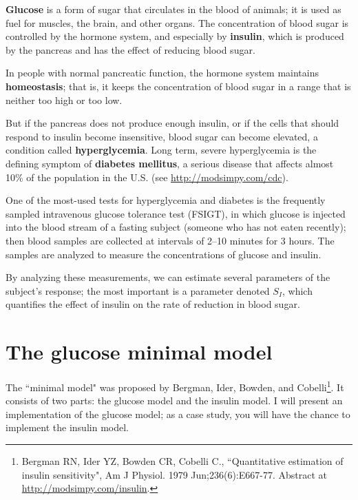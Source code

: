 \documentclass[12pt]{book}
\theoremstyle{exercise}
\begin{document}
{\bf Glucose} is a form of sugar that circulates in the blood of animals; it is used as fuel for muscles, the brain, and other organs.  The concentration of blood sugar is controlled by the hormone system, and especially by {\bf insulin}, which is produced by the pancreas and has the effect of reducing blood sugar.


In people with normal pancreatic function, the hormone system maintains {\bf homeostasis}; that is, it keeps the concentration of blood sugar in a range that is neither too high or too low.

But if the pancreas does not produce enough insulin, or if the cells that should respond to insulin become insensitive, blood sugar can become elevated, a condition called {\bf hyperglycemia}.  Long term, severe hyperglycemia is the defining symptom of {\bf diabetes mellitus}, a serious disease that affects almost 10\% of the population in the U.S. (see \url{http://modsimpy.com/cdc}).


One of the most-used tests for hyperglycemia and diabetes is the frequently sampled intravenous glucose tolerance test (FSIGT), in which glucose is injected into the blood stream of a fasting subject (someone who has not eaten recently); then blood samples are collected at intervals of 2--10 minutes for 3 hours.  The samples are analyzed to measure the concentrations of glucose and insulin.


By analyzing these measurements, we can estimate several parameters of the subject's response; the most important is a parameter denoted $S_I$, which quantifies the effect of insulin on the rate of reduction in blood sugar.


\section{The glucose minimal model}

The ``minimal model" was proposed by Bergman, Ider, Bowden, and Cobelli\footnote{Bergman RN, Ider YZ, Bowden CR, Cobelli C., ``Quantitative estimation of insulin sensitivity", Am J Physiol. 1979 Jun;236(6):E667-77.  Abstract at \url{http://modsimpy.com/insulin}.}.
It consists of two parts: the glucose model and the insulin model.  I will present an implementation of the glucose model; as a case study, you will have the chance to implement the insulin model.
\end{document}
